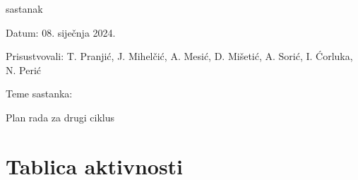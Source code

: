 \begin{packed_enum}
	  \item  sastanak
			\item[] \begin{packed_item}
			  \item Datum: 08. siječnja 2024.
				\item Prisustvovali:  T. Pranjić, J. Mihelčić, A. Mesić, D. Mišetić, A. Sorić, I. Ćorluka, N. Perić
				\item Teme sastanka:
				\begin{packed_item}
					\item  Plan rada za drugi ciklus
        \end{packed_item}
	\end{packed_item}

 
		\end{packed_enum}
		
		\eject
		\section*{Tablica aktivnosti}
		
			

